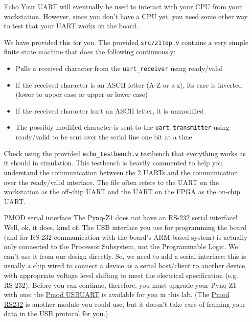 \documentclass[11pt]{article}
\makeatletter
\renewcommand{\section}
{\@startsection {section}{1}{0pt}
 {-2ex}
 {1ex}
 {\bfseries\Large}}
\renewcommand{\subsection}
{\@startsection {subsection}{1}{0pt}
 {-1ex}
 {0.5ex}
 {\bfseries\normalsize}}
\makeatother
\begin{document}
\section{Echo}
Your UART will eventually be used to interact with your CPU from your workstation.
However, since you don't have a CPU yet, you need some other way to test that your UART works on the board.

We have provided this for you. The provided \verb|src/z1top.v| contains a very simple finite state machine that does the following continuously:

\begin{itemize}
  \item Pulls a received character from the \verb|uart_receiver| using ready/valid
  \item If the received character is an ASCII letter (A-Z or a-z), its case is inverted (lower to upper case or upper or lower case)
  \item If the received character isn't an ASCII letter, it is unmodified
  \item The possibly modified character is sent to the \verb|uart_transmitter| using ready/valid to be sent over the serial line one bit at a time
\end{itemize}

Check using the provided \verb|echo_testbench.v| testbench that everything works as it should in simulation. This testbench is heavily commented to help you understand the communication between the 2 UARTs and the communication over the ready/valid interface. The file often refers to the UART on the workstation as the off-chip UART and the UART on the FPGA as the on-chip UART.

\subsection{PMOD serial interface}
The Pynq-Z1 does not have an RS-232 serial interface! Well, ok, it does, kind of. The USB interface you use for programming the board (and for RS-232 communication with the board's ARM-based system) is actually only connected to the Processor Subsystem, not the Programmable Logic. We can't use it from our design directly. So, we need to add a serial interface: this is usually a chip wired to connect a device as a serial host/client to another device, with appropriate voltage level shifting to meet the electrical specification (e.g. RS-232). Before you can continue, therefore, you must upgrade your Pynq-Z1 with one: the \href{https://store.digilentinc.com/pmod-usbuart-usb-to-uart-interface/}{Pmod USBUART} is available for you in this lab. (The \href{https://store.digilentinc.com/pmod-rs232-serial-converter-and-interface-standard/}{Pmod RS232} is another module you could use, but it doesn't take care of framing your data in the USB protocol for you.)
\end{document}
